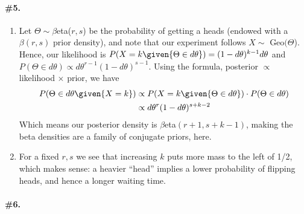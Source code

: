 \documentclass[12pt,titlepage]{article}\usepackage{graphicx, color}
\begin{document}
\paragraph{\#5.}
\begin{enumerate}
\item Let $\Theta \sim \beta$eta($r,s$) be the probability of getting a heads (endowed with a $\beta(r,s)$ prior density), and note that our experiment follows $X \sim$ Geo$(\Theta$). Hence, our likelihood is $P(X = k \given{\Theta \in d\theta}) = (1-d\theta)^{k-1}d\theta$ and $P(\Theta \in d\theta) \propto d\theta^{r-1}(1-d\theta)^{s-1}$. Using the formula, posterior $\propto$ likelihood $\times$ prior, we have
\begin{align*}
P(\Theta \in d\theta \given{X = k}) &\propto P(X = k \given{\Theta \in d\theta}) \cdot P(\Theta \in d\theta) \\
&\propto d\theta^{r}(1-d\theta)^{s+k-2}
\end{align*}
Which means our posterior density is $\beta$eta$(r+1,s+k-1)$, making the beta densities are a family of conjugate priors, here. 
\item For a fixed $r,s$ we see that increasing $k$ puts more mass to the left of 1/2, which makes sense: a heavier ``head'' implies a lower probability of flipping heads, and hence a longer waiting time. 
\end{enumerate}

\paragraph{\#6.} 
\end{document}
